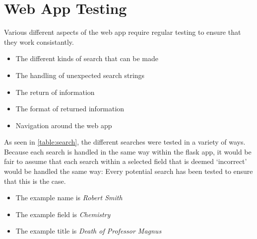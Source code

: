 \documentclass[11pt,a4paper]{article}
\begin{document}
\section{Web App Testing}
Various different aspects of the web app require regular testing to ensure that they work consistantly.
\begin{itemize}
	\item The different kinds of search that can be made
	\item The handling of unexpected search strings
	\item The return of information
	\item The format of returned information
	\item Navigation around the web app
\end{itemize}
As seen in \ref{table:search}, the different searches were tested in a variety of ways. Because each search is handled in the same way within the flask app, it would be fair to assume that each search within a selected field that is deemed `incorrect' would be handled the same way: Every potential search has been tested to ensure that this is the case. 
\begin{itemize}
	\item The example name is \textit{Robert Smith}
	\item The example field is \textit{Chemistry}
	\item The example title is \textit{Death of Professor Magnus}
\end{itemize}
\end{document}
